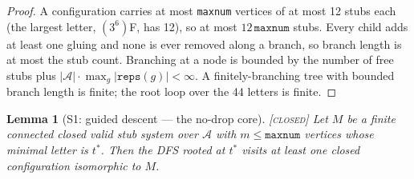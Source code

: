 \documentclass[11pt]{article}
\newtheorem{lemma}[theorem]{Lemma}
\theoremstyle{definition}
\newcommand{\CLOSED}{\textnormal{\textsc{[closed]}}}
\newcommand{\A}{\mathcal{A}}
\begin{document}
\begin{proof}
A configuration carries at most \texttt{maxnum} vertices of at most 12 stubs each (the
largest letter, $(3^6)$F, has 12), so at most $12\,\texttt{maxnum}$ stubs. Every child
adds at least one gluing and none is ever removed along a branch, so branch length is at
most the stub count. Branching at a node is bounded by the number of free stubs plus
$|\A| \cdot \max_g |\texttt{reps}(g)| < \infty$. A finitely-branching tree with bounded
branch length is finite; the root loop over the 44 letters is finite.
\end{proof}

\begin{lemma}[S1: guided descent --- the no-drop core]\label{lem:S1} \CLOSED\;
Let $M$ be a finite connected closed valid stub system over $\A$ with
$m \le \texttt{maxnum}$ vertices whose minimal letter is $t^\ast$. Then the DFS rooted at
$t^\ast$ visits at least one closed configuration isomorphic to $M$.
\end{lemma}
\end{document}
